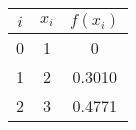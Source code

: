 \begin{tabular}{|c|c|c|}
\hline
$i$ & $x_i$ & $f(x_i)$ \\
\hline
0 & 1 & 0 \\
1 & 2 & 0.3010 \\
2 & 3 & 0.4771 \\
\hline
\end{tabular}  